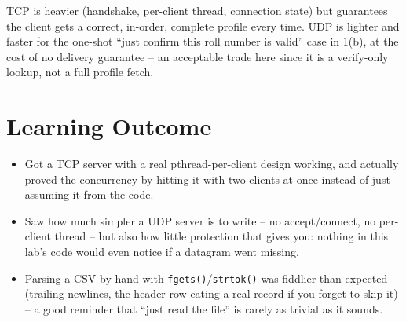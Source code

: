 \documentclass[11pt,a4paper]{article}
\begin{document}
TCP is heavier (handshake, per-client thread, connection state) but guarantees the client
gets a correct, in-order, complete profile every time. UDP is lighter and faster for the
one-shot ``just confirm this roll number is valid'' case in 1(b), at the cost of no
delivery guarantee -- an acceptable trade here since it is a verify-only lookup, not a
full profile fetch.

\section*{Learning Outcome}
\begin{itemize}
\item Got a TCP server with a real pthread-per-client design working, and actually proved
the concurrency by hitting it with two clients at once instead of just assuming it from
the code.
\item Saw how much simpler a UDP server is to write -- no accept/connect, no per-client
thread -- but also how little protection that gives you: nothing in this lab's code would
even notice if a datagram went missing.
\item Parsing a CSV by hand with \texttt{fgets()}/\texttt{strtok()} was fiddlier than
expected (trailing newlines, the header row eating a real record if you forget to skip
it) -- a good reminder that ``just read the file'' is rarely as trivial as it sounds.
\end{itemize}
\end{document}
